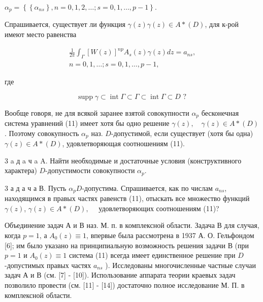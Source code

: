 \documentclass[10pt]{article}
\begin{document}
$\alpha_{p}=\left\{\left\{\alpha_{n s}\right\}, n=0,1,2, \ldots ; s=0,1, \ldots, p-1\right\}$.



Спрашивается, существует ли функция $\gamma(z) \gamma(z) \in A *(D)$, для к-рой имеют место равенства



\[

\begin{gathered}

\frac{1}{2 \pi} \int_{\Gamma}[W(z)]^{n p} A_{s}(z) \gamma(z) d z=a_{n s}, \\

n=0,1, \ldots ; s=0,1, \ldots, p-1,

\end{gathered}

\]



где



\[

\operatorname{supp} \gamma \subset \operatorname{int} \Gamma \subset \Gamma \subset \operatorname{int} \Gamma \subset D \text { ? }

\]



Вообще говоря, не для всякой заранее взятой совокупности $\alpha_{p}$ бесконечная система уравнений (11) имеет хотя бы одно решение $\gamma(z), \quad \gamma(z) \in A *(D)$. Поэтому совокупность $\alpha_{p}$ наз. $D$-допустимой, если существует (хотя бы одна) $\gamma(z) \in A *(D)$, удовлетворяющая соотношениям (11).



3 a д a ч a A. Найти необходимые и достаточные условия (конструктивного характера) $D$-допустимости совокупности $\alpha_{p}$.



3 а д а ч а В. Пусть $\alpha_{p} D$-допустима. Спрашивается, как по числам $a_{n s}$, находящимся в правых частях равенств (11), отыскать все множество функций $\gamma(z)$, $\gamma(z) \in A *(D), \quad$ удовлетворяющих соотношениям (11)?



Объединение задач А и В наз. М. п. в комплексной области. Задача В для случая, когда $p=1$, а $A_{0}(z) \equiv 1$, впервые была рассмотрена в 1937 А. О. Гельфондом [6]; им было указано на принципиальную возможность решения задачи В (при $p=1$ и $A_{0}(z) \equiv 1$ система (11) всегда имеет единственное решение при $D$-допустимых правых частях $a_{n s}$ ). Исследованы многочисленные частные случаи задач А и В (см. [7] - [10]). Использование аппарата теории краевых задач позволило провести (см. [11] - [14]) достаточно полное исследование М. П. в комплексной области.
\end{document}
